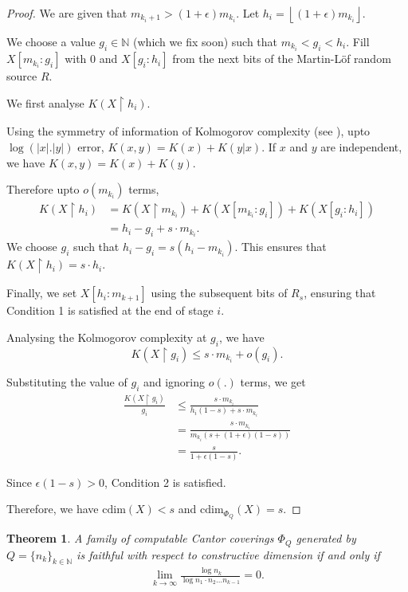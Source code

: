 \documentclass[11pt]{article}
\newtheorem{theorem}{Theorem}
\newcommand{\floor}[1]{ \left\lfloor #1 \right\rfloor }
\newcommand{\restr}{\upharpoonright}
\newcommand{\N}{\mathbb{N}}
\newcommand{\cdim}{\mathrm{cdim}}
\begin{document}
\begin{proof}
	 
	We are given that  ${m_{k_i+1}} > (1 +  \epsilon) {m_{k_i}}$. Let $h_i = \floor{(1 + \epsilon) m_{k_i}}$. 
	
	We choose a value $g_i \in \N$ (which we fix soon) such that $m_{k_i} < g_i < h_i$. Fill $X[m_{k_i} : g_i]$ with $0$ and $X[g_i : h_i]$ from the next bits of the Martin-L\"of random source $R$. 
	
	
	We first analyse $K(X \restr h_i)$.
	
	Using the symmetry of information of Kolmogorov complexity (see \cite{LiVitanyi}), upto $\log(|x|.|y|)$ error, $K(x,y) = K(x) + K(y|x)$. If $x$ and $y$ are independent, we have $K(x,y) = K(x) + K(y)$.
	
	
	Therefore upto $o(m_{k_i})$ terms, 
	\begin{align*}
		K(X \restr h_i) &= K(X \restr m_{k_{i}}) +  K(X[m_{k_i} : g_i]) + K(X[g_i : h_i])\\
		& = h_i - g_i + s \cdot m_{k_i}.
	\end{align*}
	We choose $g_i$ such that $h_i - g_i = s (h_i - m_{k_i})$. This ensures that $K(X \restr h_i) = s \cdot h_i$. 
	
	Finally, we set $X[h_i : m_{k + 1}]$ using the subsequent bits of $R_s$, ensuring that Condition 1 is satisfied at the end of stage $i$.
	
	Analysing the Kolmogorov complexity at $g_i$, we have
	$$K(X \restr g_i) \leq s\cdot m_{k_i} + o(g_i).$$
	
	Substituting the value of $g_i$ and ignoring $o(.)$ terms, we get
	\begin{align*}
		\frac{K(X \restr g_i)}{g_i} &\leq \frac{s \cdot m_{k_i}}{h_i(1-s) + s \cdot m_{k_i}} \\
		&= \frac{s \cdot m_{k_i}}{m_{k_i}(s + (1 + \epsilon) (1- s))}\\
		&= \frac{s}{1  + \epsilon (1 - s)}.
	\end{align*}

	Since $\epsilon(1-s) > 0$,  Condition 2 is satisfied.
	
	Therefore, we have $\cdim(X) < s$ and $\cdim_{\Phi_Q}(X) = s$. 
\end{proof}





\begin{theorem} \label{thm:EffFaithCondn}
	A family of computable Cantor coverings $\Phi_Q$ generated by $Q =
	\{n_k\}_{k \in \N}$ is faithful with respect to constructive
	dimension if and only if 	
	\begin{align}
		\label{log_limit_condition}
		\lim_{k\rightarrow \infty} \frac{\log n_k}{\log n_1 \cdot n_2
			\dots n_{k-1}} = 0.
	\end{align}
\end{theorem}
\end{document}
